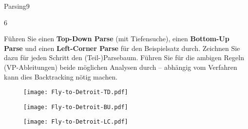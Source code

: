 \documentclass{julie-exercises}
\begin{document}
\begin{aufgabe}{Parsing}{9}
\begin{teilaufgabe}{}{6}


		Führen Sie einen \textbf{Top-Down Parse} (mit Tiefensuche), einen \textbf{Bottom-Up Parse} und einen \textbf{Left-Corner Parse} für den Beispielsatz durch. Zeichnen Sie dazu für jeden Schritt den (Teil-)Parsebaum. Führen Sie für die ambigen Regeln (VP-Ableitungen) beide m\"oglichen Analysen durch -- abhängig vom Verfahren kann dies Backtracking n\"otig machen.

		\begin{loesung}
			\begin{figure}[h]
		 		\centering
			 	\texttt{[image: Fly-to-Detroit-TD.pdf]}
			\end{figure}
			\begin{figure}[h]
		 		\centering
			 	\texttt{[image: Fly-to-Detroit-BU.pdf]}
			\end{figure}
				\begin{figure}[h]
		 		\centering
			 	\texttt{[image: Fly-to-Detroit-LC.pdf]}
			\end{figure}
		\end{loesung}

	\end{teilaufgabe}
\end{aufgabe}
\end{document}
